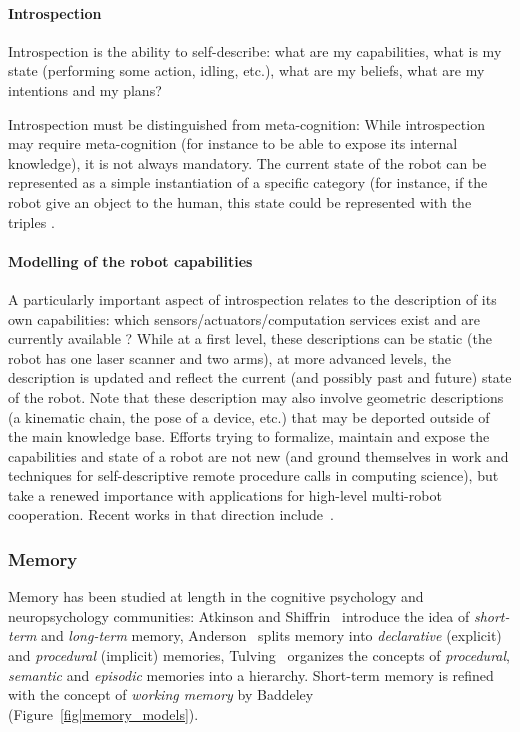 \paragraph{Introspection}

Introspection is the ability to self-describe: what are my capabilities, what
is my state (performing some action, idling, etc.), what are my beliefs, what
are my intentions and my plans?

Introspection must be distinguished from meta-cognition: While introspection
may require meta-cognition (for instance to be able to expose its internal
knowledge), it is not always mandatory. The current state of the robot can be
represented as a simple instantiation of a specific category (for instance, if
the robot give an object to the human, this state could be represented with the
triples .

\paragraph{Modelling of the robot capabilities}

A particularly important aspect of introspection relates to the description of
its own capabilities: which sensors/actuators/computation services exist and
are currently available ?  While at a first level, these descriptions can be
static (\eg the robot has one laser scanner and two arms), at more advanced
levels, the description is updated and reflect the current (and possibly past
and future) state of the robot. Note that these description may also involve
geometric descriptions (a kinematic chain, the pose of a device, etc.) that may
be deported outside of the main knowledge base. Efforts trying to formalize,
maintain and expose the capabilities and state of a robot are not new (and
ground themselves in work and techniques for self-descriptive remote procedure
calls in computing science), but take a renewed importance with applications
for high-level multi-robot cooperation. Recent works in that direction
include~\cite{Kunze2011}.

\subsubsection{Memory}
\label{sect|memory}

Memory has been studied at length in the cognitive psychology and
neuropsychology communities: Atkinson and Shiffrin~\cite{Atkinson1968}
introduce the idea of \emph{short-term} and \emph{long-term} memory,
Anderson~\cite{Anderson1976} splits memory into \emph{declarative} (explicit)
and \emph{procedural} (implicit) memories, Tulving~\cite{Tulving1985} organizes
the concepts of \emph{procedural}, \emph{semantic} and \emph{episodic} memories
into a hierarchy. Short-term memory is refined with the concept of
\emph{working memory} by Baddeley~\cite{Baddeley2010}
(Figure~\ref{fig|memory_models}).

